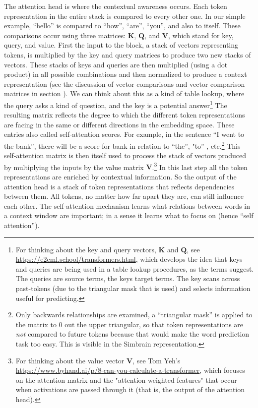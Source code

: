 The attention head is where the contextual awareness occurs. Each token
representation in the entire stack is compared to every other one.  In our
simple example, ``hello'' is compared to ``how'', ``are'',  ``you'', and also
to itself. These comparisons occur using three matrices: $\textbf{K}$,
$\textbf{Q}$, and $\textbf{V}$, which stand for key, query, and value. First
the input to the block, a stack of vectors representing tokens, is multiplied
by the key and query matrices to produce two new stacks of vectors. These
stacks of keys and queries are then multiplied (using a dot product) in all
possible combinations and then normalized to produce a context representation
(see the discussion of vector comparisons and vector comparison matrices in
section ). We can think about this as a kind of
table lookup, where the query asks a kind of question, and the key is a
potential answer\footnote{For thinking about the key and query vectors,
$\textbf{K}$ and $\textbf{Q}$, see
\url{https://e2eml.school/transformers.html}, which develops the idea that keys
and queries are being used in a table lookup procedures, as the terms suggest.
The queries are source terms, the keys target terms. The key scans across
past-tokens (due to the triangular mask that is used) and selects information
useful for predicting.} The resulting matrix reflects the degree to which the
different token representations are facing in the same or different directions
in the embedding space. These entries also called self-attention scores. For
example, in the sentence ``I went to the bank'', there will be a score for bank
in relation to ``the'', "to'' , etc.\footnote{Only backwards relationships are
examined, a ``triangular mask'' is applied to the matrix to 0 out the upper
triangular, so that token representations are \emph{not} compared to future
tokens because that would make the word prediction task too easy. This is
visible in the Simbrain representation.}  This self-attention matrix is then
itself used to process the stack of vectors produced by multiplying the inputs
by the value matrix  $\textbf{V}$.\footnote{For thinking about the value vector
$\textbf{V}$, see Tom Yeh's
\url{https://www.byhand.ai/p/8-can-you-calculate-a-transformer}, which focuses
on the attention matrix and the "attention weighted features" that occur when
activations are passed through it (that is, the output of the attention head).}
In this last step all the token representations are enriched by contextual
information. So the output of the attention head is a stack of token
representations that reflects dependencies between them. All tokens, no matter
how far apart they are, can still influence each other. The self-attention
mechanism learns what relations between words in a context window are
important; in a sense it learns what to focus on (hence ``self attention'').

